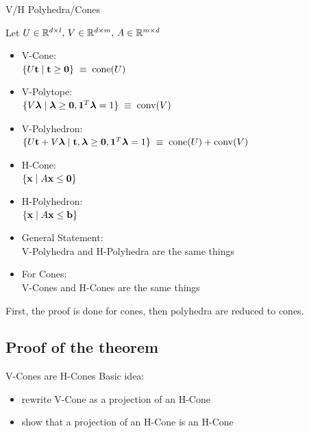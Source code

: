 \documentclass{beamer}
\begin{document}
\newcommand{\UCone}{\{U\t \st \t \geq \0\}}
\newcommand{\TUCone}{\pmb \0 & -I \\ I & -U \\ -I & U \pme}

\begin{frame}{V/H Polyhedra/Cones}

	Let $U \in \mathbb{R}^{d\times l},\, V \in \mathbb{R}^{d\times m},\, A \in \mathbb{R}^{m\times d}$
	\begin{itemize}
		\item V-Cone:\\ $\UCone \;\equiv\; \cone(U)$
		\item V-Polytope:\\ $\{V\bm{\lambda} \;|\; \bm{\lambda} \geq \mathbf{0}, \mathbf{1}^T\bm{\lambda} = 1\} \;\equiv\; \operatorname{conv}(V)$
		\item V-Polyhedron:\\ $\{U\mathbf{t} + V\bm{\lambda} \;|\; \mathbf{t},\bm{\lambda} \geq \mathbf{0}, \mathbf{1}^T\bm{\lambda} = 1\} \;\equiv\; \operatorname{cone}(U) + \operatorname{conv}(V)$
		\item H-Cone:\\ $\{\mathbf{x} \;|\; A\mathbf{x} \leq \mathbf{0} \}$
		\item H-Polyhedron:\\ $\{\mathbf{x} \;|\; A\mathbf{x} \leq \mathbf{b} \}$
	\end{itemize}
\end{frame}

\begin{frame}{\MWT}
	\begin{itemize}
		\item General Statement: \\
		      V-Polyhedra and H-Polyhedra are the same things
		      \pause
		\item For Cones: \\
		      V-Cones and H-Cones are the same things
		      \pause
	\end{itemize}
	First, the proof is done for cones, then polyhedra are reduced to cones.
\end{frame}


\subsection{Proof of the theorem}

\begin{frame}{V-Cones are H-Cones}
	Basic idea:
	\begin{itemize}
		\item rewrite V-Cone as a projection of an H-Cone
		\item show that a projection of an H-Cone is an H-Cone
	\end{itemize}
\end{frame}
\end{document}
